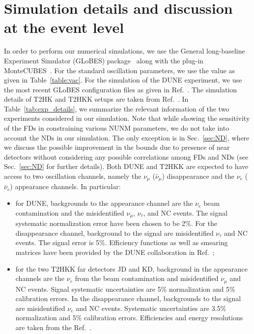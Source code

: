 \documentclass[11pt,a4paper]{article}
\begin{document}
\section{Simulation details and discussion at the event level}
\label{sec:sim-details}


In order to perform our numerical simulations, we use the General long-baseline Experiment Simulator (GLoBES) package~\cite{Huber:2004ka,Huber:2007ji} along with the plug-in MonteCUBES~\cite{Blennow:2016jkn}. For the standard oscillation parameters, we use the value as given in Table~\ref{table:vac}. For the simulation of the DUNE experiment, we use the  most recent GLoBES configuration files as given in Ref.~\cite{DUNE:2021cuw}. The simulation details of T2HK and T2HKK setups are taken from Ref.~\cite{Hyper-Kamiokande:2016srs}. In Table~\ref{tab:exp_details}, we summarize the relevant information of the two experiments considered in our simulation.
Note that while showing the sensitivity of the FDs in constraining various NUNM parameters, we do not take into account the NDs in our simulation. The only exception is in Sec.~\ref{sec:ND}, where we discuss the possible improvement in the bounds due to presence of near detectors without considering any possible correlations among FDs and NDs (see Sec.~\ref{sec:ND} for further details). 
Both DUNE and T2HKK are expected to have access to two oscillation channels, namely the $\nu_\mu$ ($\bar{\nu}_\mu$) disappearance and the $\nu_e$ ($\bar{\nu}_e$) appearance channels. In particular:
\begin{itemize}
    \item for DUNE, backgrounds to the appearance channel are the $\nu_e$ beam contamination and the misidentified $\nu_\mu$, $\nu_\tau$, and NC events. The signal systematic normalization error have been chosen to be 2\%. For the disappearance channel, background to the signal are misidentified $\nu_\tau$ and NC events. The signal error is 5\%. Efficiency functions as well as smearing matrices have been provided by the DUNE collaboration in Ref.~\cite{DUNE:2021cuw};
    \item for the two T2HKK far detectors JD and KD, background in the appearance channels are the $\nu_e$ from the beam contamination and misidentified $\nu_\mu$ and NC events. Signal systematic uncertainties are 5\% normalization and 5\% calibration errors. In the disappearance channel, backgrounds to the signal are misidentified $\nu_e$ and NC events. Systematic uncertainties are 3.5\% normalization and 5\% calibration errors. Efficiencies and energy resolutions are taken from the Ref.~\cite{Hyper-Kamiokande:2016srs}.
\end{itemize}
\end{document}
